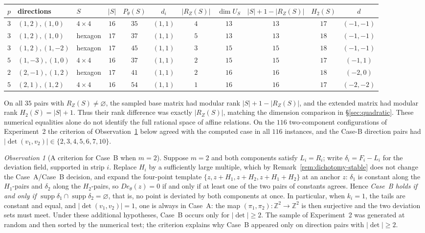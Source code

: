 \documentclass[11pt,reqno]{amsart}
\theoremstyle{plain}
\theoremstyle{definition}
\theoremstyle{remark}
\newtheorem{obs}[thm]{Observation}
\theoremstyle{plain}
\theoremstyle{remark}
\theoremstyle{definition}
\numberwithin{equation}{section}
\DeclareMathOperator{\supp}{supp}
\newcommand{\Z}{\mathbb{Z}}
\begin{document}
\begin{center}\small
\begin{tabular}{@{}cllcccccccc@{}}
\toprule
$p$ & directions & $S$ & $|S|$ & $P_\theta(S)$ & $d_i$ & $|R_Z(S)|$ &
$\dim U_S$ & $|S|+1-|R_Z(S)|$ & $H_2(S)$ & $d$\\
\midrule
$3$ & $(1,2),(1,0)$ & $4\times4$ & $16$ & $35$ & $(1,1)$ & $4$ & $13$ & $13$ & $17$ & $(-1,-1)$\\
$3$ & $(1,2),(1,0)$ & hexagon & $17$ & $37$ & $(1,1)$ & $5$ & $13$ & $13$ & $18$ & $(-1,-1)$\\
$3$ & $(1,2),(1,-2)$ & hexagon & $17$ & $45$ & $(1,1)$ & $3$ & $15$ & $15$ & $18$ & $(-1,-1)$\\
$5$ & $(1,-3),(1,0)$ & $4\times4$ & $16$ & $37$ & $(1,1)$ & $2$ & $15$ & $15$ & $17$ & $(-1,1)$\\
$2$ & $(2,-1),(1,2)$ & hexagon & $17$ & $41$ & $(1,1)$ & $2$ & $16$ & $16$ & $18$ & $(-2,0)$\\
$5$ & $(2,1),(1,2)$ & $4\times4$ & $16$ & $54$ & $(1,1)$ & $1$ & $16$ & $16$ & $17$ & $(-2,-2)$\\
\bottomrule
\end{tabular}
\end{center}

\noindent
On all $35$ pairs with $R_Z(S)\ne\varnothing$, the sampled base matrix had
modular rank $|S|+1-|R_Z(S)|$, and the extended matrix had modular rank
$H_2(S)=|S|+1$.  Thus their rank difference was exactly $|R_Z(S)|$, matching
the dimension comparison in \S\ref{sec:quadratic}.  These numerical equalities
alone do not identify the full rational space of affine relations.  On the
$116$ two-component configurations of Experiment~2 the criterion of
Observation~\ref{obs:m2} below agreed with the computed case in all $116$
instances, and the Case-B direction pairs had $|\det(v_1,v_2)|\in
\{2,3,4,5,6,7,10\}$.

\begin{obs}[A criterion for Case~B when $m=2$]\label{obs:m2}
Suppose $m=2$ and both components satisfy $L_i=R_i$; write
$\delta_i=F_i-L_i$ for the deviation field, supported in strip $i$.  Replace
$H_i$ by a sufficiently large multiple, which by
Remark~\ref{rem:dichotomy-stable} does not change the Case~A/Case~B decision,
and expand the four-point template $\{z,z+H_1,z+H_2,z+H_1+H_2\}$ at an anchor
$z$: $\delta_1$ is constant along the $H_1$-pairs and $\delta_2$ along the
$H_2$-pairs, so $De_\theta(z)=0$ if and only if at least one of the two pairs of
constants agrees.  Hence \emph{Case~B holds if and only if
$\supp\delta_1\cap\supp\delta_2=\varnothing$}, that is, no point is deviated by
both components at once.  In particular, when $k_i=1$, the tails are constant
and equal, and $|\det(v_1,v_2)|=1$, one is always in Case~A: the map
$(\pi_1,\pi_2)\colon\Z^2\to\Z^2$ is then surjective and the two deviation sets
must meet.  Under these additional hypotheses, Case~B occurs only for
$|\det|\ge2$.  The sample of Experiment~2 was
generated at random and then sorted by the numerical test; the criterion
explains why Case~B appeared only on direction pairs with $|\det|\ge2$.
\end{obs}
\end{document}
